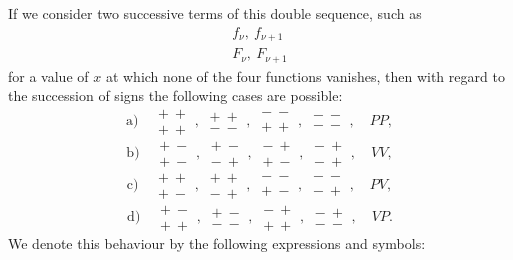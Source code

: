 
If we consider two successive terms of this double sequence, such as
\[
\begin{array}{l}
f_\nu,\ f_{\nu+1} \\
F_\nu,\ F_{\nu+1}
\end{array}
\]
for a value of $x$ at which none of the four functions vanishes, then with
regard to the succession of signs the following cases are possible:
\[
\text{a)}\quad
\begin{array}{c}+\ +\\+\ +\end{array},\
\begin{array}{c}+\ +\\-\ -\end{array},\
\begin{array}{c}-\ -\\+\ +\end{array},\
\begin{array}{c}-\ -\\-\ -\end{array},\quad PP,
\]
\[
\text{b)}\quad
\begin{array}{c}+\ -\\+\ -\end{array},\
\begin{array}{c}+\ -\\-\ +\end{array},\
\begin{array}{c}-\ +\\+\ -\end{array},\
\begin{array}{c}-\ +\\-\ +\end{array},\quad VV,
\]
\[
\text{c)}\quad
\begin{array}{c}+\ +\\+\ -\end{array},\
\begin{array}{c}+\ +\\-\ +\end{array},\
\begin{array}{c}-\ -\\+\ -\end{array},\
\begin{array}{c}-\ -\\-\ +\end{array},\quad PV,
\]
\[
\text{d)}\quad
\begin{array}{c}+\ -\\+\ +\end{array},\
\begin{array}{c}+\ -\\-\ -\end{array},\
\begin{array}{c}-\ +\\+\ +\end{array},\
\begin{array}{c}-\ +\\-\ -\end{array},\quad VP.
\]
We denote this behaviour by the following expressions and symbols:

